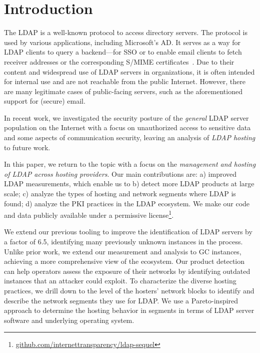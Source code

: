\section{Introduction}
\label{sec:introduction}
The \gls{LDAP} is a well-known protocol to access directory servers.
The protocol is used by various applications, including Microsoft's \gls{AD}. It serves as a way for \gls{LDAP} clients to query a backend---\eg for \gls{SSO} or to enable email clients to fetch receiver addresses or the corresponding S/MIME certificates~\cite{OndaroEtAl_MINECollectingAnalyzing_2025}.
Due to their content and widespread use of \gls{LDAP} servers in organizations, it is often intended for internal use and are not reachable from the public Internet. However, there are many legitimate cases of public-facing servers, such as the aforementioned support for (secure) email.

In recent work, we investigated the security posture of the \emph{general} \gls{LDAP} server population on the Internet \cite{landscape} with a focus on unauthorized access to sensitive data and some aspects of communication security, leaving an analysis of \emph{\gls{LDAP} hosting} to future work.

In this paper, we return to the topic with a focus on the \emph{management and hosting of \gls{LDAP} across hosting providers}. Our main contributions are: a) improved \gls{LDAP} measurements, which enable us to b) detect more \gls{LDAP} products at large scale; c) analyze the types of hosting and network segments where \gls{LDAP} is found; d) analyze the \gls{PKI} practices in the \gls{LDAP} ecosystem. We make our code and data publicly available under a permissive license\footnote{\url{github.com/internettransparency/ldap-sequel}}.

We extend our previous tooling to improve the identification of \gls{LDAP} servers by a factor of 6.5, identifying many previously unknown instances in the process. Unlike prior work, we extend our measurement and analysis to \gls{GC} instances, achieving a more comprehensive view of the ecosystem.
Our product detection can help operators assess the exposure of their networks by identifying outdated instances that an attacker could exploit.
To characterize the diverse hosting practices, we drill down to the level of the hosters' network blocks to identify and describe the network segments they use for \gls{LDAP}. We use a Pareto-inspired approach to determine the hosting behavior in segments in terms of \gls{LDAP} server software and underlying operating system.

